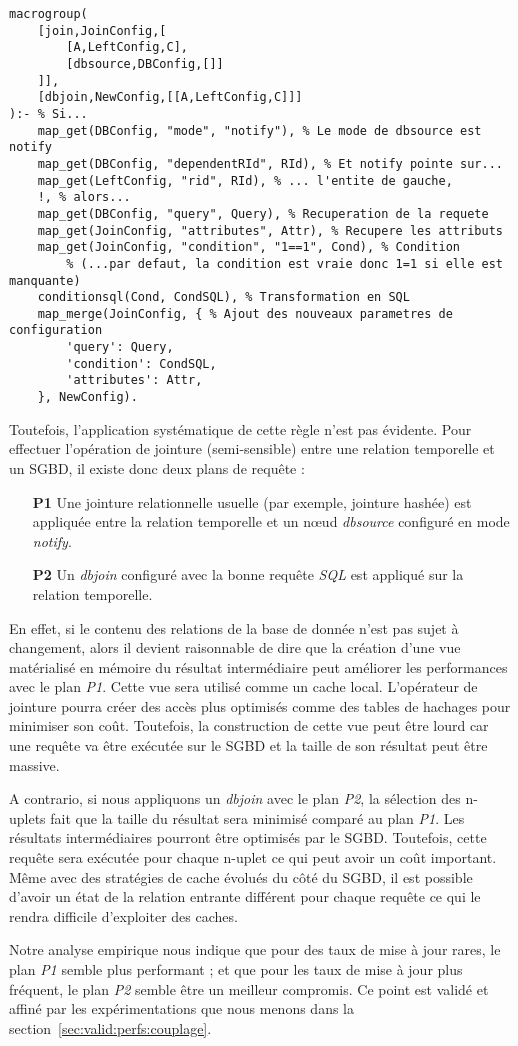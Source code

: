 \begin{lstlisting}
macrogroup(
    [join,JoinConfig,[
        [A,LeftConfig,C],
        [dbsource,DBConfig,[]]
    ]],
    [dbjoin,NewConfig,[[A,LeftConfig,C]]]
):- % Si...
    map_get(DBConfig, "mode", "notify"), % Le mode de dbsource est notify
    map_get(DBConfig, "dependentRId", RId), % Et notify pointe sur...
    map_get(LeftConfig, "rid", RId), % ... l'entite de gauche,
    !, % alors...
    map_get(DBConfig, "query", Query), % Recuperation de la requete
    map_get(JoinConfig, "attributes", Attr), % Recupere les attributs
    map_get(JoinConfig, "condition", "1==1", Cond), % Condition
        % (...par defaut, la condition est vraie donc 1=1 si elle est manquante)
    conditionsql(Cond, CondSQL), % Transformation en SQL
    map_merge(JoinConfig, { % Ajout des nouveaux parametres de configuration
        'query': Query,
        'condition': CondSQL, 
        'attributes': Attr,
    }, NewConfig).
\end{lstlisting}

Toutefois, l'application systématique de cette règle n'est pas évidente. Pour effectuer l'opération de jointure (semi-sensible) entre une relation temporelle et un SGBD, il existe donc deux plans de requête :
\begin{itemize}
    \item[\textbf{P1}] Une jointure relationnelle usuelle (par exemple, jointure hashée) est appliquée entre la relation temporelle et un nœud \textit{dbsource} configuré en mode \textit{notify}.
    \item[\textbf{P2}] Un \textit{dbjoin} configuré avec la bonne requête \textit{SQL} est appliqué sur la relation temporelle.
\end{itemize}

En effet, si le contenu des relations de la base de donnée n'est pas sujet à changement, alors il devient raisonnable de dire que la création d'une vue matérialisé en mémoire du résultat intermédiaire peut améliorer les performances avec le plan \textit{P1}. Cette vue sera utilisé comme un cache local. L'opérateur de jointure pourra créer des accès plus optimisés comme des tables de hachages pour minimiser son coût. Toutefois, la construction de cette vue peut être lourd car une requête va être exécutée sur le SGBD et la taille de son résultat peut être massive.

A contrario, si nous appliquons un \textit{dbjoin} avec le plan \textit{P2}, la sélection des n-uplets fait que la taille du résultat sera minimisé comparé au plan \textit{P1}. Les résultats intermédiaires pourront être optimisés par le SGBD. Toutefois, cette requête sera exécutée pour chaque n-uplet ce qui peut avoir un coût important. Même avec des stratégies de cache évolués du côté du SGBD, il est possible d'avoir un état de la relation entrante différent pour chaque requête ce qui le rendra difficile d'exploiter des caches.

Notre analyse empirique nous indique que pour des taux de mise à jour rares, le plan \textit{P1} semble plus performant ; et que pour les taux de mise à jour plus fréquent, le plan \textit{P2} semble être un meilleur compromis. Ce point est validé et affiné par les expérimentations que nous menons dans la section~\ref{sec:valid:perfs:couplage}.
